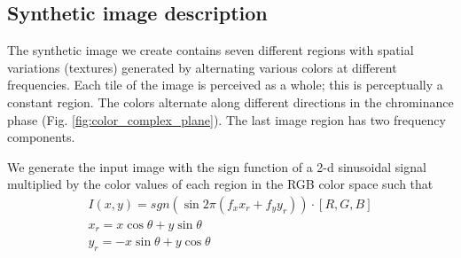 \documentclass[journal]{IEEEtran}
\begin{document}
%        



\subsection{Synthetic image description}
The synthetic image we create contains seven different regions with spatial variations (textures) generated by alternating various colors at different frequencies. Each tile of the image is perceived as a whole; this is perceptually a constant region. The colors alternate along different directions in the chrominance phase (Fig. \ref{fig:color_complex_plane}). The last image region has two frequency components.

We generate the input image with the sign function of a 2-d sinusoidal signal multiplied by the color values of each region in the RGB color space such that
\begin{gather}
	I(x, y) = sgn( \sin 2 \pi (f_x x_r + f_y y_r)) \cdot [R, G, B]\label{eq:2D_squared_signal}\\
	x_r = x \cos\theta + y \sin\theta \nonumber \\
    y_r = -x \sin\theta + y \cos\theta \nonumber  
\end{gather}
\end{document}
